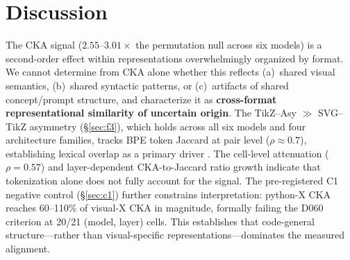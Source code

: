 \FloatBarrier
\section{Discussion}
\label{sec:discussion}

The CKA signal ($2.55$--$3.01\times$ the permutation null across six models) is a second-order effect within representations overwhelmingly organized by format.
We cannot determine from CKA alone whether this reflects (a)~shared visual semantics, (b)~shared syntactic patterns, or (c)~artifacts of shared concept/prompt structure, and characterize it as \textbf{cross-format representational similarity of uncertain origin}.
The TikZ--Asy $\gg$ SVG--TikZ asymmetry (\S\ref{sec:f3}), which holds across all six models and four architecture families, tracks BPE token Jaccard at pair level ($\rho \approx 0.7$), establishing lexical overlap as a primary driver \cite{jawahar2019bert, hewitt-manning-2019-structural}.
The cell-level attenuation ($\rho = 0.57$) and layer-dependent CKA-to-Jaccard ratio growth indicate that tokenization alone does not fully account for the signal.
\label{sec:disc-syntax}
The pre-registered C1 negative control (\S\ref{sec:c1}) further constrains interpretation: python-X CKA reaches 60--110\% of visual-X CKA in magnitude, formally failing the D060 criterion at 20/21 (model, layer) cells.
This establishes that code-general structure---rather than visual-specific representations---dominates the measured alignment.


